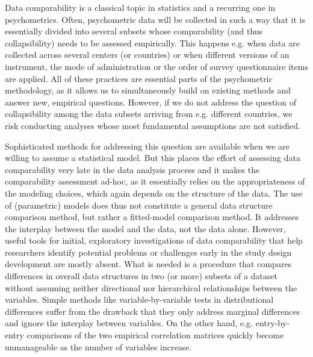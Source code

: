 \documentclass[titlepage,11pt,twoside]{article}
\begin{document}
Data comparability is a classical topic in statistics and a recurring one in psychometrics. Often, psychometric data will be collected in such a way that it is essentially divided into several subsets whose comparability (and thus collapsibility) needs to be assessed empirically. This happens e.g. when data are collected across several centers (or countries) or when different versions of an instrument, the mode of administration or the order of survey questionnaire items are applied. All of these practices are essential parts of the psychometric methodology, as it allows us to simultaneously build on existing methods and answer new, empirical questions. However, if we do not address the question of collapsibility among the data subsets arriving from e.g. different countries, we risk conducting analyses whose most fundamental assumptions are not satisfied. 

Sophisticated methods for addressing this question are available when we are willing to assume a statistical model. But this places the effort of assessing data comparability very late in the data analysis process and it makes the comparability assessment %
ad-hoc, as it essentially relies on the appropriateness of the modeling choices, which again depends on the structure of the data. The use of (parametric) models does thus not constitute a %
general data structure comparison method, but rather a fitted-model comparison method. It addresses the interplay between the model and the data, not the data alone. However, useful tools for initial, exploratory investigations of data comparability that help researchers identify potential problems or challenges early in the study design development are mostly absent. What is needed is a procedure that compares differences in overall data structures in two (or more) subsets of a dataset without assuming neither directional nor hierarchical relationships between the variables. Simple methods like variable-by-variable tests in distributional differences suffer from the drawback that they only address marginal differences and ignore the interplay between variables. On the other hand, e.g. entry-by-entry comparisons of the two empirical correlation matrices quickly become unmanageable as the number of variables increase. 
\end{document}

